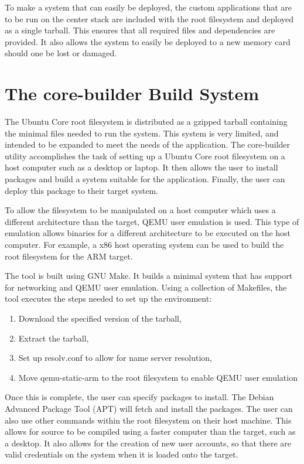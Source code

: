 \documentclass[ece]{uw-wkrpt}
\begin{document}
To make a system that can easily be deployed, the custom applications that are
to be run on the center stack are included with the root filesystem and deployed
as a single tarball. This ensures that all required files and dependencies are
provided. It also allows the system to easily be deployed to a new memory card
should one be lost or damaged.

\section{The core-builder Build System}

The Ubuntu Core root filesystem is distributed as a gzipped tarball containing
the minimal files needed to run the system. This system is very limited, and
intended to be expanded to meet the needs of the application. The core-builder
utility accomplishes the task of setting up a Ubuntu Core root filesystem on a
host computer such as a desktop or laptop. It then allows the user to install
packages and build a system suitable for the application. Finally, the user can
deploy this package to their target system.

To allow the filesystem to be manipulated on a host computer which uses a
different architecture than the target, QEMU user emulation is used. This type
of emulation allows binaries for a different architecture to be executed on the
host computer. For example, a x86 host operating system can be used to build the
root filesystem for the ARM target.

The tool is built using GNU Make. It builds a minimal system that has
support for networking and QEMU user emulation. Using a collection of
Makefiles, the tool executes the steps needed to set up the environment:

\begin{enumerate}
  \item Download the specified version of the tarball,
  \item Extract the tarball,
  \item Set up resolv.conf to allow for name server resolution,
  \item Move qemu-static-arm to the root filesystem to enable QEMU user
  emulation
\end{enumerate}

Once this is complete, the user can specify packages to install. The Debian
Advanced Package Tool (APT) will fetch and install the packages. The user can
also use other commands within the root filesystem on their host machine. This
allows for source to be compiled using a faster computer than the target, such
as a desktop. It also allows for the creation of new user accounts, so that
there are valid credentials on the system when it is loaded onto the target.
\end{document}
